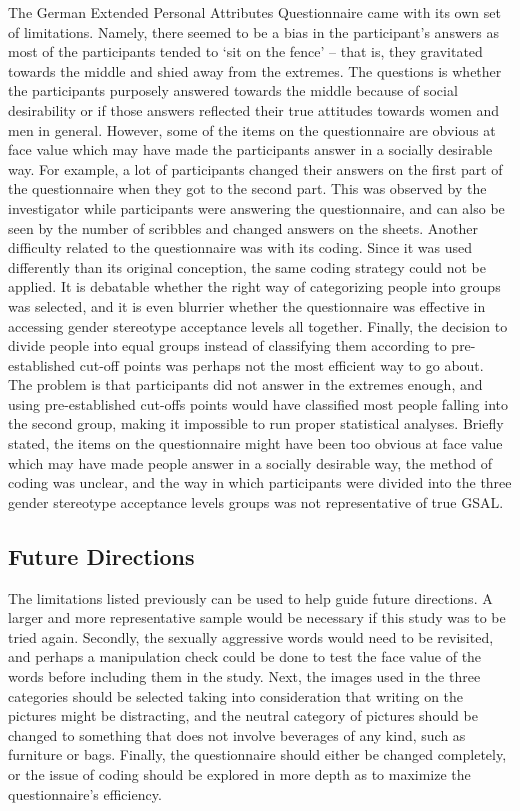 \documentclass[authordate, serif, review]{jote-article}
\begin{document}
\begin{multicols}{2}
The German Extended Personal Attributes Questionnaire came with its own set of limitations. Namely, there seemed to be a bias in the participant's answers as most of the participants tended to `sit on the fence' -- that is, they gravitated towards the middle and shied away from the extremes. The questions is whether the participants purposely answered towards the middle because of social desirability or if those answers reflected their true attitudes towards women and men in general. However, some of the items on the questionnaire are obvious at face value which may have made the participants answer in a socially desirable way. For example, a lot of participants changed their answers on the first part of the questionnaire when they got to the second part. This was observed by the investigator while participants were answering the questionnaire, and can also be seen by the number of scribbles and changed answers on the sheets. Another difficulty related to the questionnaire was with its coding. Since it was used differently than its original conception, the same coding strategy could not be applied. It is debatable whether the right way of categorizing people into groups was selected, and it is even blurrier whether the questionnaire was effective in accessing gender stereotype acceptance levels all together. Finally, the decision to divide people into equal groups instead of classifying them according to pre-established cut-off points was perhaps not the most efficient way to go about. The problem is that participants did not answer in the extremes enough, and using pre-established cut-offs points would have classified most people falling into the second group, making it impossible to run proper statistical analyses. Briefly stated, the items on the questionnaire might have been too obvious at face value which may have made people answer in a socially desirable way, the method of coding was unclear, and the way in which participants were divided into the three gender stereotype acceptance levels groups was not representative of true GSAL.  

{}
\subsection*{Future Directions }

The limitations listed previously can be used to help guide future directions. A larger and more representative sample would be necessary if this study was to be tried again. Secondly, the sexually aggressive words would need to be revisited, and perhaps a manipulation check could be done to test the face value of the words before including them in the study. Next, the images used in the three categories should be selected taking into consideration that writing on the pictures might be distracting, and the neutral category of pictures should be changed to something that does not involve beverages of any kind, such as furniture or bags. Finally, the questionnaire should either be changed completely, or the issue of coding should be explored in more depth as to maximize the questionnaire's efficiency.  


\end{multicols}
\end{document}
